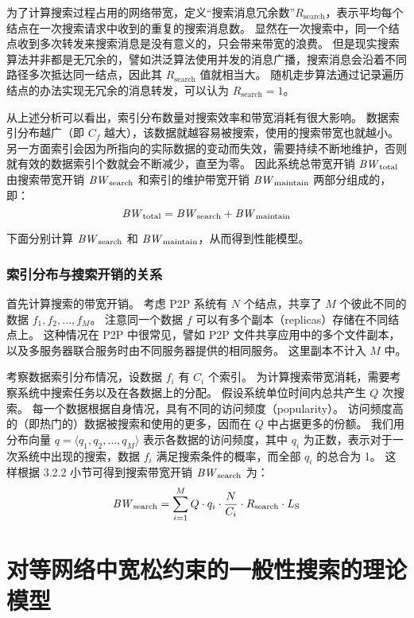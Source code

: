 \documentclass[degree=doctor]{thuthesis}
\begin{document}
为了计算搜索过程占用的网络带宽，定义“搜索消息冗余数”$R_{\text{search}}$，表示平均每个结点在一次搜索请求中收到的重复的搜索消息数。
显然在一次搜索中，同一个结点收到多次转发来搜索消息是没有意义的，只会带来带宽的浪费。
但是现实搜索算法并非都是无冗余的，譬如洪泛算法使用并发的消息广播，搜索消息会沿着不同路径多次抵达同一结点，因此其 $R_{\text{search}}$ 值就相当大。
随机走步算法通过记录遍历结点的办法实现无冗余的消息转发，可以认为 $R_{\text{search}} = 1$。

从上述分析可以看出，索引分布数量对搜索效率和带宽消耗有很大影响。
数据索引分布越广（即 $C_f$ 越大），该数据就越容易被搜索，使用的搜索带宽也就越小。
另一方面索引会因为所指向的实际数据的变动而失效，需要持续不断地维护，否则就有效的数据索引个数就会不断减少，直至为零。
因此系统总带宽开销 $\mathit{BW}_{\text{total}}$ 由搜索带宽开销 $\mathit{BW}_{\text{search}}$ 和索引的维护带宽开销 $\mathit{BW}_{\text{maintain}}$ 两部分组成的，即：
\begin{equation}
  \mathit{BW}_{\text{total}} = \mathit{BW}_{\text{search}} + \mathit{BW}_{\text{maintain}}
\end{equation}

下面分别计算 $\mathit{BW}_{\text{search}}$ 和 $\mathit{BW}_{\text{maintain}}$，从而得到性能模型。


\subsection{索引分布与搜索开销的关系}

首先计算搜索的带宽开销。
考虑 P2P 系统有 $N$ 个结点，共享了 $M$ 个彼此不同的数据 $f_1, f_2, \dots, f_M$。
注意同一个数据 $f$ 可以有多个副本（replicas）存储在不同结点上。
这种情况在 P2P 中很常见，譬如 P2P 文件共享应用中的多个文件副本，以及多服务器联合服务时由不同服务器提供的相同服务。
这里副本不计入 $M$ 中。

考察数据索引分布情况，设数据 $f_i$ 有 $C_i$ 个索引。
为计算搜索带宽消耗，需要考察系统中搜索任务以及在各数据上的分配。
假设系统单位时间内总共产生 $Q$ 次搜索。
每一个数据根据自身情况，具有不同的访问频度（popularity）。
访问频度高的（即热门的）数据被搜索和使用的更多，因而在 $Q$ 中占据更多的份额。
我们用分布向量 $q = \langle q_1, q_2 , \dots, q_M \rangle$ 表示各数据的访问频度，其中 $q_i$ 为正数，表示对于一次系统中出现的搜索，数据 $f_i$ 满足搜索条件的概率，而全部 $q_i$ 的总合为 1。
这样根据 3.2.2 小节可得到搜索带宽开销 $\mathit{BW}_{\text{search}}$ 为：
\begin{equation}
  \mathit{BW}_{\text{search}} = \sum_{i=1}^M Q \cdot q_i \cdot \frac{N}{C_i} \cdot R_{\text{search}} \cdot L_{\text{S}}
\end{equation}




\chapter{对等网络中宽松约束的一般性搜索的理论模型}
\end{document}
